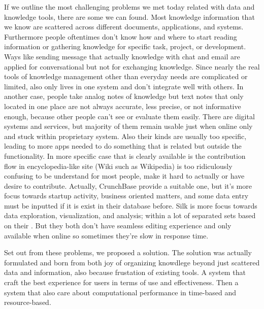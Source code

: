 If we outline the most challenging problems we met today related with data and knowledge tools, there are some we can found.
Most knowledge information that we know are scattered across different documents, applications, and systems.
Furthermore people oftentimes don't know how and where to start reading information or gathering knowledge for specific task, project, or development.
Ways like sending message that actually knowledge with chat and email are applied for conversational but not for exchanging knowledge.
Since nearly the real tools of knowledge management other than everyday needs are complicated or limited, also only lives in one system and don't integrate well with others.
In another case, people take analog notes of knowledge but text notes that only located in one place are not always accurate, less precise, or not informative enough, because other people can't see or evaluate them easily.
There are digital systems and services, but majority of them remain usable just when online only and stuck within proprietary system.
Also their kinds are usually too specific, leading to more apps needed to do something that is related but outside the functionality.
In more specific case that is clearly available is the contribution flow in encyclopedia-like site (Wiki such as Wikipedia) is too ridiculously confusing to be understand for most people, make it hard to actually or have desire to contribute.
Actually, CrunchBase provide a suitable one, but it's more focus towards startup activity, business oriented matters, and some data entry must be inputted if it is exist in their database before.
Silk is more focus towards data exploration, visualization, and analysis; within a lot of separated sets based on their .
But they both don't have seamless editing experience and only available when online so sometimes they're slow in response time.

Set out from these problems, we proposed a solution.
The solution was actually formulated and born from both joy of organizing knowdlege beyond just scattered data and information, also because frustation of existing tools.
A system that craft the best experience for users in terms of use and effectiveness.
Then a system that also care about computational performance in time-based and resource-based.

